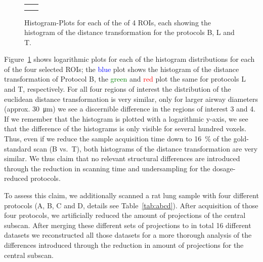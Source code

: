 \renewcommand{\imsize}{.309\columnwidth}
\begin{figure}
	\centering
	\caption{Histogram-Plots for each of the of 4 ROIs, each showing the histogram of the distance transformation for the protocols B, L and T.}%
	\ifiucr
		\begin{tabular}{cc}
			&%
			\\%
			&%
		\end{tabular}
	\else
	\fi	
	\label{fig:DTFplots}
\end{figure}

Figure~\ref{fig:DTFplots} shows logarithmic plots for each of the histogram distributions for each of the four selected ROIs; the \textcolor{blue}{blue} plot shows the histogram of the distance transformation of Protocol B, the \textcolor{green}{green} and \textcolor{red}{red} plot the same for protocols L and T, respectively. For all four regions of interest the distribution of the euclidean distance transformation is very similar, only for larger airway diameters (approx. \SI{30}{\micro\meter}) we see a discernible difference in the regions of interest 3 and 4. If we remember that the histogram is plotted with a logarithmic y-axis, we see that the difference of the histograms is only visible for several hundred voxels. Thus, even if we reduce the sample acquisition time down to \SI{16}{\percent} of the gold-standard scan (B vs.\ T), both histograms of the distance transformation are very similar. We thus claim that no relevant structural differences are introduced through the reduction in scanning time and undersampling for the dosage-reduced protocols.

To assess this claim, we additionally scanned a rat lung sample with four different protocols (A, B, C and D, details see Table~\ref{tab:abcd}). After acquisition of those four protocols, we artificially reduced the amount of projections of the central subscan. After merging these different sets of projections to in total 16 different datasets we reconstructed all those datasets for a more thorough analysis of the differences introduced through the reduction in amount of projections for the central subscan.

